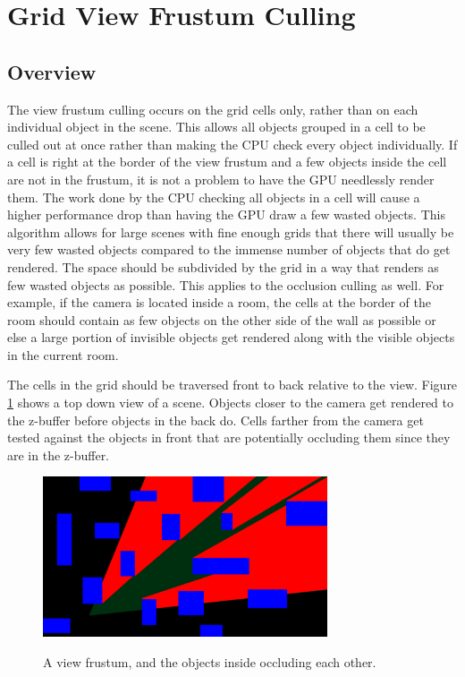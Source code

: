 \documentclass[12pt]{ucthesis}
\newcommand{\captionfonts}{\small\bf\ssp}
\begin{document}
\section{Grid View Frustum Culling}
\label{grid-view-frustum-culling}

\subsection{Overview}
\label{Overview}
The view frustum culling occurs on the grid cells only, rather than on each individual object in the scene.
This allows all objects grouped in a cell to be culled out at once rather than making the CPU check every object individually.
If a cell is right at the border of the view frustum and a few objects inside the cell are not in the frustum, it is not a problem to have the GPU needlessly render them.
The work done by the CPU checking all objects in a cell will cause a higher performance drop than having the GPU draw a few wasted objects.
This algorithm allows for large scenes with fine enough grids that there will usually be very few wasted objects compared to the immense number of objects that do get rendered.
The space should be subdivided by the grid in a way that renders as few wasted objects as possible.
This applies to the occlusion culling as well.
For example, if the camera is located inside a room, the cells at the border of the room should contain as few objects on the other side of the wall as possible or else a large portion of invisible objects get rendered along with the visible objects in the current room.

The cells in the grid should be traversed front to back relative to the view.
Figure \ref{fig:vf-and-occluders} shows a top down view of a scene.
Objects closer to the camera get rendered to the z-buffer before objects in the back do.
Cells farther from the camera get tested against the objects in front that are potentially occluding them since they are in the z-buffer.

\begin{figure}
\begin{center}
\includegraphics[width=0.75\textwidth]{Images/frustFigure.png}
\captionfonts
\caption[View Frustum and Occluders]{A view frustum, and the objects inside occluding each other.}
\label{fig:vf-and-occluders}
\end{center}
\end{figure}
\end{document}
